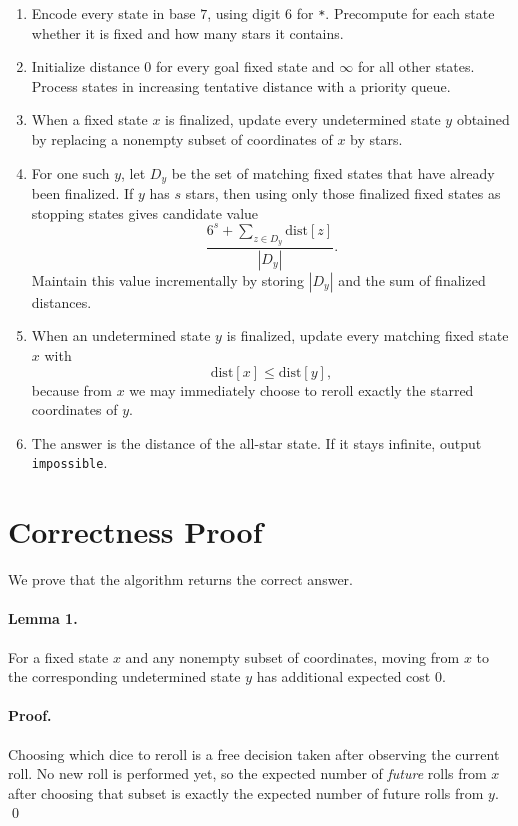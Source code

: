 \documentclass[11pt]{article}
\begin{document}
\begin{enumerate}[leftmargin=*]
    \item Encode every state in base $7$, using digit $6$ for \texttt{*}. Precompute for each state whether it
    is fixed and how many stars it contains.
    \item Initialize distance $0$ for every goal fixed state and $\infty$ for all other states. Process states in
    increasing tentative distance with a priority queue.
    \item When a fixed state $x$ is finalized, update every undetermined state $y$ obtained by replacing a
    nonempty subset of coordinates of $x$ by stars.
    \item For one such $y$, let $D_y$ be the set of matching fixed states that have already been finalized. If
    $y$ has $s$ stars, then using only those finalized fixed states as stopping states gives candidate value
    \[
    \frac{6^s + \sum_{z \in D_y} \mathrm{dist}[z]}{|D_y|}.
    \]
    Maintain this value incrementally by storing $|D_y|$ and the sum of finalized distances.
    \item When an undetermined state $y$ is finalized, update every matching fixed state $x$ with
    \[
    \mathrm{dist}[x] \le \mathrm{dist}[y],
    \]
    because from $x$ we may immediately choose to reroll exactly the starred coordinates of $y$.
    \item The answer is the distance of the all-star state. If it stays infinite, output \texttt{impossible}.
\end{enumerate}

\section*{Correctness Proof}

We prove that the algorithm returns the correct answer.

\paragraph{Lemma 1.}
For a fixed state $x$ and any nonempty subset of coordinates, moving from $x$ to the corresponding
undetermined state $y$ has additional expected cost $0$.

\paragraph{Proof.}
Choosing which dice to reroll is a free decision taken after observing the current roll. No new roll is
performed yet, so the expected number of \emph{future} rolls from $x$ after choosing that subset is exactly
the expected number of future rolls from $y$. \qed
\end{document}
